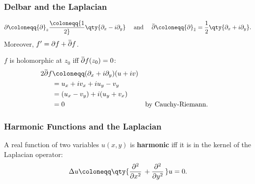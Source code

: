 
\hypertarget{delbar-and-the-laplacian}{%
\subsubsection{Delbar and the
Laplacian}\label{delbar-and-the-laplacian}}

\begin{definition}

\begin{align*}
{\partial}\coloneqq{\partial}_z \coloneqq{1\over 2}\qty{{\partial}_x - i {\partial}_y}
\quad
\text{ and }
\quad
{ \mkern 1.5mu\overline{\mkern-1.5mu{\partial}\mkern-1.5mu}\mkern 1.5mu}
\coloneqq{\partial}_{\mkern 1.5mu\overline{\mkern-1.5muz\mkern-1.5mu}\mkern 1.5mu}
={1\over 2}\qty{ {\partial}_x + i{\partial}_y}
.\end{align*}
Moreover,
\(f' = {\partial}f + { \mkern 1.5mu\overline{\mkern-1.5mu{\partial}\mkern-1.5mu}\mkern 1.5mu}f\).

\end{definition}

\begin{proposition}

\(f\) is holomorphic at \(z_0\) iff
\({ \mkern 1.5mu\overline{\mkern-1.5mu{\partial}\mkern-1.5mu}\mkern 1.5mu}f(z_0) = 0\):
\begin{align*}
2{ \mkern 1.5mu\overline{\mkern-1.5mu{\partial}\mkern-1.5mu}\mkern 1.5mu}f 
&\coloneqq({\partial}_x + i {\partial}_y) (u+iv) \\
&= u_x + iv_x + iu_y - v_y \\
&= (u_x - v_y) + i(u_y + v_x) \\
&= 0 && \text{by Cauchy-Riemann}
.\end{align*}

\end{proposition}

\hypertarget{harmonic-functions-and-the-laplacian}{%
\subsubsection{Harmonic Functions and the
Laplacian}\label{harmonic-functions-and-the-laplacian}}

\begin{definition}

A real function of two variables \(u(x, y)\) is \textbf{harmonic} iff it
is in the kernel of the Laplacian operator:
\begin{align*}  
\Delta u \coloneqq\qty{{\frac{\partial ^2}{\partial x^2}\,} + {\frac{\partial ^2}{\partial y^2}\,}}u = 0
.\end{align*}

\end{definition}

